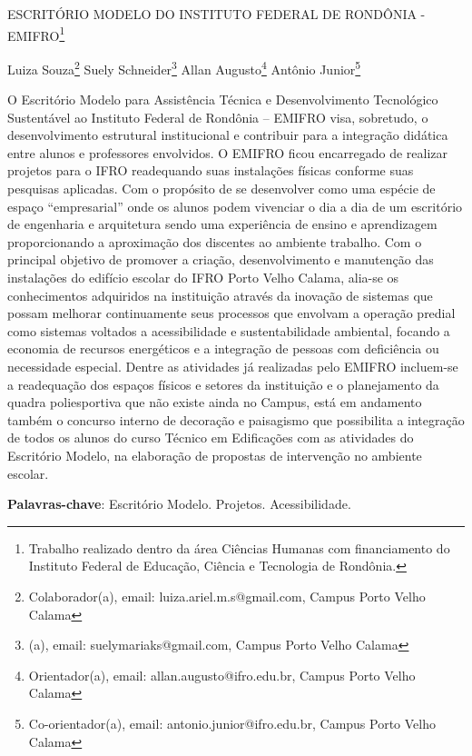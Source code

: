 \documentclass[article,12pt,onesidea,4paper,english,brazil]{abntex2}
\begin{document}
	
	
	\frenchspacing 
	
	\begin{center}
		\LARGE ESCRITÓRIO MODELO DO INSTITUTO FEDERAL DE RONDÔNIA - EMIFRO\footnote{Trabalho realizado dentro da área Ciências Humanas com financiamento do Instituto Federal de Educação, Ciência e Tecnologia de Rondônia.}
		
		\normalsize
		Luiza Souza\footnote{Colaborador(a), email: luiza.ariel.m.s@gmail.com, Campus Porto Velho Calama} 
		Suely Schneider\footnote{(a), email: suelymariaks@gmail.com, Campus Porto Velho Calama} 
		Allan Augusto\footnote{Orientador(a), email: allan.augusto@ifro.edu.br, Campus Porto Velho Calama} 
		Antônio Junior\footnote{Co-orientador(a), email: antonio.junior@ifro.edu.br, Campus Porto Velho Calama} 
	\end{center}
	
	\noindent O Escritório Modelo para Assistência Técnica e Desenvolvimento Tecnológico Sustentável ao Instituto Federal de Rondônia – EMIFRO visa, sobretudo, o desenvolvimento estrutural institucional e contribuir para a integração didática entre alunos e professores envolvidos. O EMIFRO ficou encarregado de realizar projetos para o IFRO readequando suas instalações físicas conforme suas pesquisas aplicadas. Com o propósito de se desenvolver como uma espécie de espaço “empresarial” onde os alunos podem vivenciar o dia a dia de um escritório de engenharia e arquitetura sendo uma experiência de ensino e aprendizagem proporcionando a aproximação dos discentes ao ambiente trabalho. Com o principal objetivo de promover a criação, desenvolvimento e manutenção das instalações do edifício escolar do IFRO Porto Velho Calama, alia-se os conhecimentos adquiridos na instituição através da inovação de sistemas que possam melhorar continuamente seus processos que envolvam a operação predial como sistemas voltados a acessibilidade e sustentabilidade ambiental, focando a economia de recursos energéticos e a integração de pessoas com deficiência ou necessidade especial. Dentre as atividades já realizadas pelo EMIFRO incluem-se a readequação dos espaços físicos e setores da instituição e o planejamento da quadra poliesportiva que não existe ainda no Campus, está em andamento também o concurso interno de decoração e paisagismo que possibilita a integração de todos os alunos do curso Técnico em Edificações com as atividades do Escritório Modelo, na elaboração de propostas de intervenção no ambiente escolar.
	
	\vspace{\onelineskip}
	
	\noindent
	\textbf{Palavras-chave}: Escritório Modelo. Projetos. Acessibilidade.
	
\end{document}
